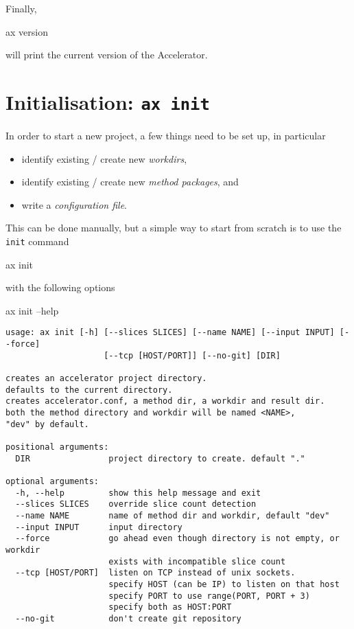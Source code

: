 Finally,
\begin{shell}
ax version
\end{shell}
will print the current version of the Accelerator.



\section{Initialisation: \texttt{ax init}}
\label{sec:initialisation}
In order to start a new project, a few things need to be set up, in
particular
\begin{itemize}
\item[] identify existing / create new \textsl{workdirs},
\item[] identify existing / create new \textsl{method packages}, and
\item[] write a \textsl{configuration file}.
\end{itemize}
This can be done manually, but a simple way to start from scratch is
to use the \texttt{init} command
\begin{shell}
ax init
\end{shell}
with the following options
\begin{shell}
ax init --help
\end{shell}
\begin{snugshade}
\begin{verbatim}
usage: ax init [-h] [--slices SLICES] [--name NAME] [--input INPUT] [--force]
                    [--tcp [HOST/PORT]] [--no-git] [DIR]

creates an accelerator project directory.
defaults to the current directory.
creates accelerator.conf, a method dir, a workdir and result dir.
both the method directory and workdir will be named <NAME>,
"dev" by default.

positional arguments:
  DIR                project directory to create. default "."

optional arguments:
  -h, --help         show this help message and exit
  --slices SLICES    override slice count detection
  --name NAME        name of method dir and workdir, default "dev"
  --input INPUT      input directory
  --force            go ahead even though directory is not empty, or workdir
                     exists with incompatible slice count
  --tcp [HOST/PORT]  listen on TCP instead of unix sockets.
                     specify HOST (can be IP) to listen on that host
                     specify PORT to use range(PORT, PORT + 3)
                     specify both as HOST:PORT
  --no-git           don't create git repository
\end{verbatim}
\end{snugshade}



